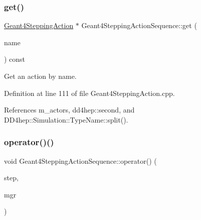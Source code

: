 \hypertarget{class_d_d4hep_1_1_simulation_1_1_geant4_stepping_action_sequence_a6f059c3e7a305ce172737a4d4003b043}{}\label{class_d_d4hep_1_1_simulation_1_1_geant4_stepping_action_sequence_a6f059c3e7a305ce172737a4d4003b043} 
\subsubsection{\texorpdfstring{get()}{get()}}
{\footnotesize\ttfamily \hyperlink{class_d_d4hep_1_1_simulation_1_1_geant4_stepping_action}{Geant4\+Stepping\+Action} $\ast$ Geant4\+Stepping\+Action\+Sequence\+::get (\begin{DoxyParamCaption}\item[{const std\+::string \&}]{name }\end{DoxyParamCaption}) const}



Get an action by name. 



Definition at line 111 of file Geant4\+Stepping\+Action.\+cpp.



References m\+\_\+actors, dd4hep\+::second, and D\+D4hep\+::\+Simulation\+::\+Type\+Name\+::split().

\hypertarget{class_d_d4hep_1_1_simulation_1_1_geant4_stepping_action_sequence_a51e1c2c59da560ac9bc6fc0d249e06dc}{}\label{class_d_d4hep_1_1_simulation_1_1_geant4_stepping_action_sequence_a51e1c2c59da560ac9bc6fc0d249e06dc} 
\subsubsection{\texorpdfstring{operator()()}{operator()()}}
{\footnotesize\ttfamily void Geant4\+Stepping\+Action\+Sequence\+::operator() (\begin{DoxyParamCaption}\item[{const G4\+Step $\ast$}]{step,  }\item[{G4\+Stepping\+Manager $\ast$}]{mgr }\end{DoxyParamCaption})\hspace{0.3cm}{\ttfamily [virtual]}}



